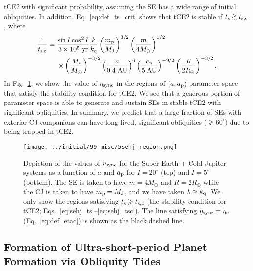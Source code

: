 \documentclass[
        fleqn,
        usenatbib,
        referee
    ]{mnras}
\newcommand*{\p}[1]{\left(#1\right)}
\newlength{\colummwidth}
\begin{document}
tCE2 with significant probability, assuming the SE has a wide range of initial
obliquities. In addition, Eq.~\eqref{eq:def_ts_crit} shows that tCE2 is stable
if $t_{\rm s} \gtrsim t_{\rm s, c}$, where
\begin{align}
    \frac{1}{t_{\rm s, c}} ={}& \frac{\sin I \cos^2 I}{3 \times
        10^5\;\mathrm{yr}}
            \frac{k}{k_{\rm q}}
            \p{\frac{m_{\rm p}}{M_{\rm J}}}^{3/2}
            \p{\frac{m}{4 M_{\oplus}}}^{1/2}\nonumber\\
        &\times \p{\frac{M_\star}{M_{\odot}}}^{-3/2}
            \p{\frac{a}{0.4\;\mathrm{AU}}}^6
            \p{\frac{a_{\rm p}}{5\;\mathrm{AU}}}^{-9/2}
            \p{\frac{R}{2 R_{\oplus}}}^{-3/2}.
            \label{eq:sehj_tsc}
\end{align}
In Fig.~\ref{fig:sehj_region}, we show the value of $\eta_{\rm sync}$ in the
regions of $\p{a, a_{\rm p}}$ parameter space that satisfy the stability
condition for tCE2. We see that a generous portion of parameter space is
able to generate and sustain SEs in stable tCE2 with significant obliquities. In
summary, we predict that a large fraction of SEs with exterior CJ
companions can have long-lived, significant obliquities ($\gtrsim 60^\circ$) due
to being trapped in tCE2.
\begin{figure}
    \centering
    \texttt{[image: ../initial/99\_misc/5sehj\_region.png]}
    \caption{Depiction of the values of $\eta_{\rm sync}$ for the Super Earth +
    Cold Jupiter systems as a function of $a$ and $a_{\rm p}$ for $I = 20^\circ$
    (top) and $I = 5^\circ$ (bottom). The SE is taken to have
    $m = 4M_{\oplus}$ and $R = 2R_{\oplus}$ while the CJ is taken to have
    $m_{\rm p} = M_{\rm J}$, and we have taken $k \approx k_{\rm q}$. We only
    show the regions satisfying $t_{\rm s} \geq t_{\rm s, c}$ (the stability
    condition for tCE2; Eqs.~\ref{eq:sehj_ts}--\ref{eq:sehj_tsc}). The line
    satisfying $\eta_{\rm sync} = \eta_{\rm c}$ (Eq.~\ref{eq:def_etac}) is shown
    as the black dashed line.}\label{fig:sehj_region}
\end{figure}

\subsection{Formation of Ultra-short-period Planet Formation via Obliquity Tides
}\label{ss:disc_usp}
\end{document}
